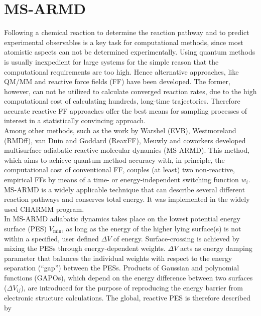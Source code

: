 \documentclass[journal=jacsat,manuscript=article]{achemso}
\author{Oliver T. Unke}
\affiliation{Department of Chemistry, University of Basel, Klingelbergstrasse 80, CH-4056 Basel, Switzerland.}
\author{Markus Meuwly}
\affiliation{Department of Chemistry, University of Basel, Klingelbergstrasse 80, CH-4056 Basel, Switzerland.}
\date{\today}
\title{}
\begin{document}
\begin{abstract}

\end{abstract}

\clearpage

\section{MS-ARMD}
\label{sec:msarmd}
Following a chemical reaction to determine the reaction pathway and to
predict experimental observables is a key task for computational
methods, since most atomistic aspects can not be determined
experimentally.\cite{brooks.chemrev.1988.msarmd} Using quantum methods
is usually inexpedient for large systems for the simple reason that
the computational requirements are too high. Hence alternative
approaches, like QM/MM\cite{warshel.jmb.1976.msarmd} and reactive
force fields (FF) have been developed. The former, however, can not be
utilized to calculate converged reaction rates, due to the high
computational cost of calculating hundreds, long-time
trajectories. Therefore accurate reactive FF approaches offer the best
means for sampling processes of interest in a statistically convincing
approach.\\

\noindent
Among other methods, such as the work by Warshel
(EVB)\cite{warshel.jacs.1980.msarmd}, Westmoreland
(RMDff)\cite{westmoreland.molsimul.2007.msarmd}, van Duin and Goddard
(ReaxFF)\cite{vanduin.jpca.2001.msarmd}, Meuwly and coworkers
developed multisurface adiabatic reactive molecular dynamics
(MS-ARMD)\cite{MM06cross,rmd08,nagy.jctc.2014.msarmd}. This method,
which aims to achieve quantum method accuracy with, in principle, the
computational cost of conventional FF, couples (at least) two
non-reactive, empirical FFs by means of a time- or energy-independent
switching function $w_i$. MS-ARMD is a widely applicable technique
that can describe several different reaction pathways and conserves
total energy. It was implemented in the widely used CHARMM
program\cite{brooks.jcc.2009.msarmd}.\\

\noindent
In MS-ARMD adiabatic dynamics takes place on the lowest potential
energy surface (PES) $V_{\text{min}}$, as long as the energy of the
higher lying surface(s) is not within a specified, user defined
$\Delta V$ of energy. Surface-crossing is achieved by mixing the PESs
through energy-dependent weights. $\Delta V$ acts as energy damping
parameter that balances the individual weights with respect to the
energy separation (``gap'') between the PESs. Products of Gaussian and
polynomial functions (GAPOs), which depend on the energy difference
between two surfaces ($\Delta V_{ij}$), are introduced for the purpose
of reproducing the energy barrier from electronic structure
calculations. The global, reactive PES is therefore described by
\end{document}
